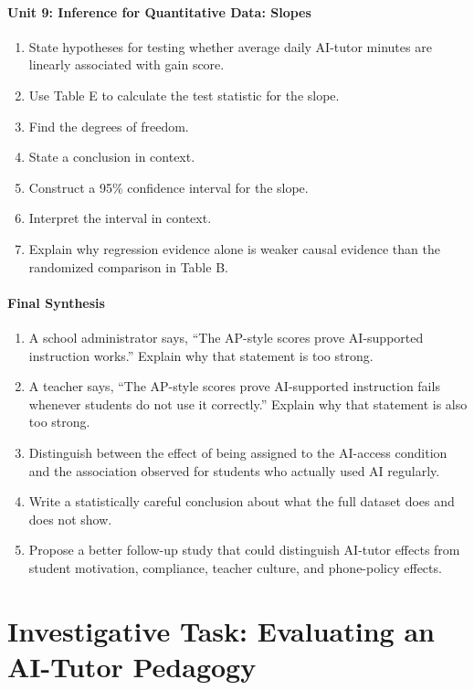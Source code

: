 \documentclass[11pt]{article}
\begin{document}
\subsection*{Unit 9: Inference for Quantitative Data: Slopes}
\begin{enumerate}[resume,leftmargin=*]
\item State hypotheses for testing whether average daily AI-tutor
minutes are linearly associated with gain score.
\item Use Table E to calculate the test statistic for the slope.
\item Find the degrees of freedom.
\item State a conclusion in context.
\item Construct a 95\% confidence interval for the slope.
\item Interpret the interval in context.
\item Explain why regression evidence alone is weaker causal evidence
than the randomized comparison in Table B.
\end{enumerate}

\subsection*{Final Synthesis}
\begin{enumerate}[resume,leftmargin=*]
\item A school administrator says, ``The AP-style scores prove
AI-supported instruction works.'' Explain why that statement is
too strong.
\item A teacher says, ``The AP-style scores prove AI-supported
instruction fails whenever students do not use it correctly.''
Explain why that statement is also too strong.
\item Distinguish between the effect of being assigned to the
AI-access condition and the association observed for students who
actually used AI regularly.
\item Write a statistically careful conclusion about what the full
dataset does and does not show.
\item Propose a better follow-up study that could distinguish
AI-tutor effects from student motivation, compliance, teacher
culture, and phone-policy effects.
\end{enumerate}

\newpage
\part{Investigative Task: Evaluating an AI-Tutor Pedagogy}
\end{document}
